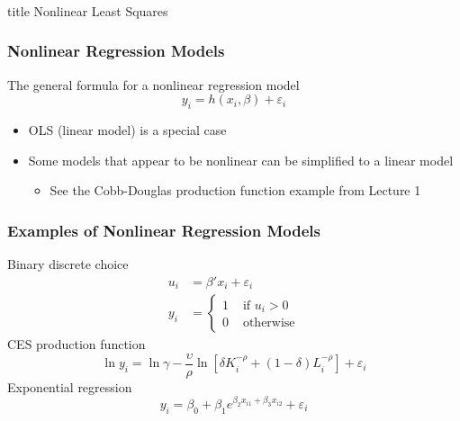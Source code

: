 \documentclass{beamer}
\begin{document}
\begin{frame}\frametitle{}
    \vfill
    \centering
    \begin{beamercolorbox}[center]{title}
        \Large Nonlinear Least Squares
    \end{beamercolorbox}
    \vfill
\end{frame}

\begin{frame}\frametitle{Nonlinear Regression Models}
    The general formula for a nonlinear regression model
    $$y_i = h(x_i, \beta) + \varepsilon_i$$
    \begin{itemize}
        \item OLS (linear model) is a special case
        \item Some models that appear to be nonlinear can be simplified to a linear model
        \begin{itemize}
            \item See the Cobb-Douglas production function example from Lecture 1
        \end{itemize}
    \end{itemize}
\end{frame}

\begin{frame}\frametitle{Examples of Nonlinear Regression Models}
    Binary discrete choice
    \begin{align*}
        u_i &= \beta' x_i + \varepsilon_i \\
        y_i &= 
            \begin{cases}
                1 & \text{ if } u_i > 0 \\
                0 & \text{ otherwise}
            \end{cases}
    \end{align*}
    \vspace{1ex}
    CES production function
    $$\ln y_i = \ln \gamma - \frac{\upsilon}{\rho} \ln \left[ \delta K_i^{-\rho} + \left( 1 - \delta \right) L_i^{-\rho} \right] + \varepsilon_i$$
    \vspace{1ex}
    Exponential regression
    $$y_i = \beta_0 + \beta_1 e^{\beta _2 x_{i1} + \beta_3 x_{i2}} + \varepsilon _i$$
\end{frame}
\end{document}
